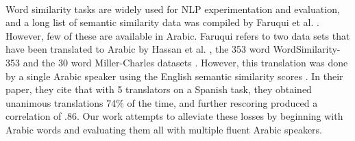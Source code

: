 \\
Word similarity tasks are widely used for NLP experimentation and evaluation, and a long list of semantic similarity data was compiled by Faruqui et al. \cite{faruqui:2014}. However, few of these are available in Arabic. Faruqui refers to two data sets that have been translated to Arabic by Hassan et al. \cite{hassan:2009}, the 353 word WordSimilarity-353 and the 30 word Miller-Charles datasets \cite{finkelstein:2001,miller:1991}. However, this translation was done by a single Arabic speaker using the English semantic similarity scores \cite{hassan:2009}. In their paper, they cite that with 5 translators on a Spanish task, they obtained unanimous translations 74\% of the time, and further rescoring produced a correlation of .86. Our work attempts to alleviate these losses by beginning with Arabic words and evaluating them all with multiple fluent Arabic speakers.